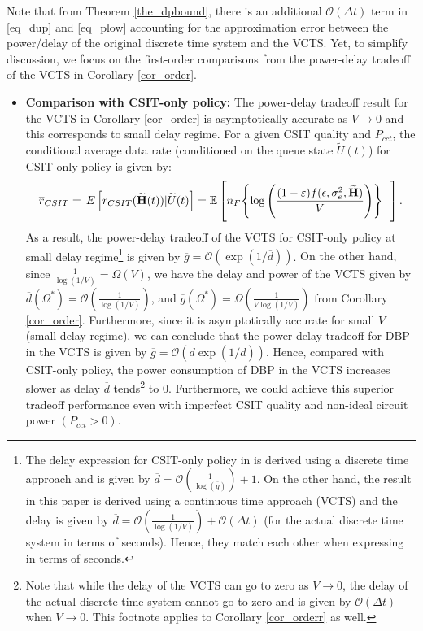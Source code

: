 \documentclass[11pt,journal, onecolumn]{./IEEEtran}
\newcommand{\blue}{\color{black}}
\newcommand{\red}{\color{black}}
\begin{document}
\begin{Remark} {\blue Note that from Theorem \ref{the_dpbound}, there is an additional $\mathcal O\left({\Delta t} \right)$ term in \eqref{eq_dup} and \eqref{eq_plow} accounting for the approximation error between the power/delay of the original discrete time system and the VCTS. Yet, to simplify discussion, we focus on the first-order comparisons from the power-delay tradeoff of the VCTS in Corollary \ref{cor_order}. }

\begin{itemize}
\item {\bf Comparison with CSIT-only policy:} The power-delay tradeoff result {\blue for the VCTS} in Corollary \ref{cor_order} is asymptotically accurate as $V\rightarrow 0$ and this corresponds to small delay regime. For a given CSIT quality and $P_{cct}$, the conditional average data rate {\red (conditioned on the queue state $\widetilde U(t)$)} for CSIT-only policy is given by:
\begin{equation}
{\overline r _{CSIT}} = \,E\left[ {{r_{CSIT}}(\widetilde{\bf{H}}(t))|\widetilde U(t)} \right] = \mathbb E\left[ {{n_F}{{\left\{ {\log \left( {\frac{{(1 - \varepsilon )f(\epsilon,\sigma_e^2,\mathbf{\widetilde{H}})}}{V}} \right)} \right\}}^ + }} \right].
\end{equation}
As a result, the power-delay tradeoff {\blue of the VCTS}  for CSIT-only policy \cite{berry_optimal_2006} at small delay regime\footnote{\red The delay expression for CSIT-only policy in \cite{berry_optimal_2006} 
{\blue is derived using a discrete time approach and is given by} $\overline{d}=\mathcal{O}(\frac{1}{\log(\overline{g})})+1$. {\blue On the other hand}, the result in this paper {\blue is  derived   using a continuous time approach (VCTS) and the delay is given by}  {\blue $\overline{d}=\mathcal O\left( \frac{1}{{\log (1/V)}} \right)+ \mathcal O(\Delta t)$ (for the actual discrete time system in terms of seconds).} Hence, they match each other when expressing in terms of seconds. } is given by $\overline g = \mathcal O(\exp(1/\overline d))$.  {\red On the other hand, since $\frac{1}{\log(1/V)}=\Omega(V)$, we have {\blue the delay and power of the VCTS given by} $
\overline d \left( {{\Omega ^*}} \right) = \mathcal O\left( \frac{1}{{\log (1/V)}} \right)$, and $
\overline g \left( {{\Omega ^*}} \right) = \Omega  \left( \frac{1 }{{ V \log (1/V)}} \right)$ from Corollary \ref{cor_order}.
Furthermore, since it is asymptotically accurate for small $V$ (small delay regime), we can conclude that the power-delay tradeoff for DBP {\blue in the VCTS} is given by $\overline g = \mathcal O(\overline d \exp(1/\overline d))$. Hence, compared with CSIT-only policy, the power consumption of DBP {\blue in the VCTS}  increases slower as delay $\overline d$ tends\footnote{{\blue Note that while the delay of the VCTS can go to zero as $V\to 0$, the delay of the actual discrete time system cannot go to zero and is given by $\mathcal O(\Delta t)$ when $V\to0$. This footnote applies to Corollary \ref{cor_orderr} as well.}}  to 0.} Furthermore, we could achieve this superior tradeoff performance even with imperfect CSIT quality and non-ideal circuit power $(P_{cct} > 0)$.


\end{itemize}
\end{Remark}
\end{document}
